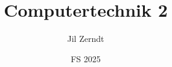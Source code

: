 \documentclass[a4paper, fontsize = 8pt, landscape]{scrartcl}
\title{Computertechnik 2}
\author{Jil Zerndt}
\date{FS 2025}
\begin{document}
\begin{multicols}{3}
	\thispagestyle{TitlePageStyle}
	\maketitle
	\sffamily
	
	\raggedcolumns
	\pagebreak
	
	\raggedcolumns
	\pagebreak
	
	\raggedcolumns
	\pagebreak
	
	\raggedcolumns
	\pagebreak
	
	\raggedcolumns
	\pagebreak
	
	\raggedcolumns
	\pagebreak
	
	\raggedcolumns
	\pagebreak
	
	\raggedcolumns
\end{multicols}
\end{document}
